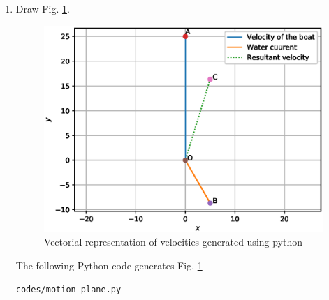 \renewcommand{\theequation}{\theenumi}
\begin{enumerate}[label=\thesection.\arabic*.,ref=\thesection.\theenumi]

\item Draw Fig. \ref{fig:motion_plane}.

\begin{figure}[!ht]
\centering
\includegraphics[width=\columnwidth]{./figs/motion_plane.eps}
\caption{Vectorial representation of velocities generated using python}
\label{fig:motion_plane}
\end{figure} 

\solution The  following Python code generates Fig. \ref{fig:motion_plane}

\begin{lstlisting}
codes/motion_plane.py
\end{lstlisting}
\end{enumerate}

